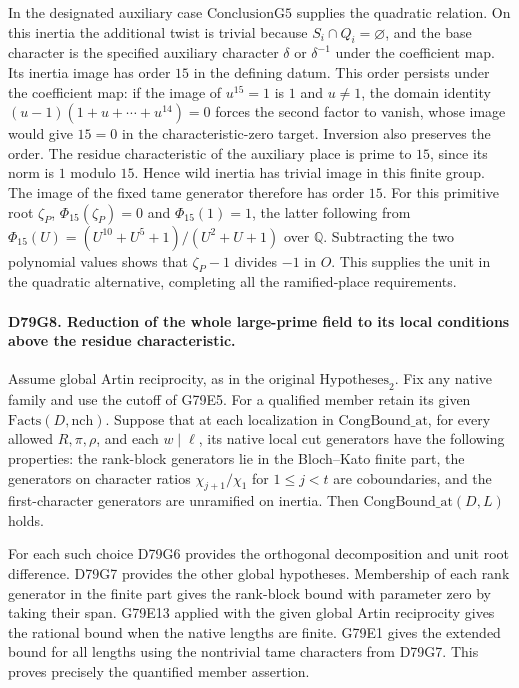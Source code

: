 In the designated auxiliary case $\mathrm{ConclusionG5}$ supplies
the quadratic relation. On this inertia the additional twist is
trivial because $S_i\cap Q_i=\varnothing$, and the base character
is the specified auxiliary character $\delta$ or $\delta^{-1}$
under the coefficient map. Its inertia image has order $15$ in
the defining datum. This order persists under the coefficient map:
if the image of $u^{15}=1$ is $1$ and $u\ne1$, the domain identity
$(u-1)(1+u+\cdots+u^{14})=0$ forces the second factor to vanish,
whose image would give $15=0$ in the characteristic-zero target.
Inversion also preserves the order. The residue characteristic of
the auxiliary place is prime to $15$, since its norm is $1$ modulo
$15$. Hence wild inertia has trivial image in this finite group.
The image of the fixed tame generator therefore has order $15$.
For this primitive root $\zeta_P$, $\Phi_{15}(\zeta_P)=0$ and
$\Phi_{15}(1)=1$, the latter following from
$\Phi_{15}(U)=(U^{10}+U^5+1)/(U^2+U+1)$ over $\mathbb Q$.
Subtracting the two polynomial values shows that $\zeta_P-1$
divides $-1$ in $O$. This supplies the unit in the quadratic
alternative, completing all the ramified-place requirements.

\paragraph{D79G8. Reduction of the whole large-prime field to its local conditions above the residue characteristic.}
Assume global Artin reciprocity, as in the original
$\mathrm{Hypotheses}_2$. Fix any native family and use the cutoff
of G79E5. For a qualified
member retain its given $\mathrm{Facts}(D,\mathrm{nch})$. Suppose
that at each localization in $\mathrm{CongBound\_at}$, for every
allowed $R,\pi,\rho$, and each $w\mid\ell$, its native local
cut generators have the following properties:
the rank-block generators lie in the Bloch--Kato finite part,
the generators on character ratios $\chi_{j+1}/\chi_1$ for
$1\le j<t$ are coboundaries, and the first-character generators
are unramified on inertia. Then $\mathrm{CongBound\_at}(D,L)$ holds.

For each such choice D79G6 provides the orthogonal decomposition and
unit root difference. D79G7 provides the other global hypotheses.
Membership of each rank generator in the finite part gives the
rank-block bound with parameter zero by taking their span. G79E13
applied with the given global Artin reciprocity gives the rational
bound when the native lengths are finite. G79E1 gives the extended
bound for all lengths using the nontrivial tame characters from
D79G7. This proves precisely the quantified member assertion.

